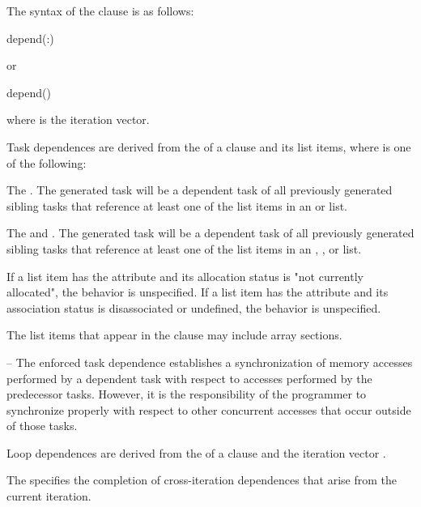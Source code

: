 \syntax
The syntax of the  clause is as follows:

\begin{boxedcode}
depend(:)
\end{boxedcode}

or

\begin{boxedcode}
depend(\plc{[: vec]})
\end{boxedcode}

where  is the iteration vector.

\descr
Task dependences are derived from the  of a  clause and its list 
items, where  is one of the following:

The  . The generated task will be a dependent task of all previously 
generated sibling tasks that reference at least one of the list items in an  or  
 list.

The  and  . The generated task will be a dependent task of 
all previously generated sibling tasks that reference at least one of the list items in an 
, , or   list.

\fortranspecificstart
If a list item has the  attribute and its allocation
status is "not currently allocated", the behavior is unspecified. If a
list item has the  attribute and its association status
is disassociated or undefined, the behavior is unspecified.
\fortranspecificend

The list items that appear in the  clause may include array sections.

\notestart
\noteheader – The enforced task dependence establishes a synchronization of memory 
accesses performed by a dependent task with respect to accesses performed by the 
predecessor tasks. However, it is the responsibility of the programmer to synchronize properly with respect to other concurrent accesses that occur outside of those tasks.
\noteend

Loop dependences are derived from the  of a  clause and the iteration vector .

The   specifies the completion of cross-iteration dependences that arise from the current iteration.


